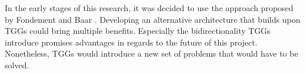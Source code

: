 In the early stages of this research, it was decided to use the approach proposed by Fondement and Baar \cite{fondement_making_2005}. Developing an alternative architecture that builds upon TGGs could bring multiple benefits. Especially the bidirectionality TGGs introduce promises advantages in regards to the future of this project. Nonetheless, TGGs would introduce a new set of problems that would have to be solved.




